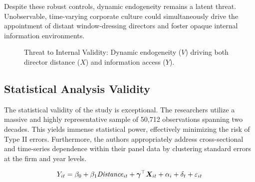 \documentclass[11pt, a4paper]{article}
\begin{document}
Despite these robust controls, dynamic endogeneity remains a latent threat. Unobservable, time-varying corporate culture could simultaneously drive the appointment of distant window-dressing directors and foster opaque internal information environments.

\begin{figure}[H]
	\centering
	\caption{Threat to Internal Validity: Dynamic endogeneity ($V$) driving both director distance ($X$) and information access ($Y$).}
\end{figure}

\subsection*{Statistical Analysis Validity}
The statistical validity of the study is exceptional. The researchers utilize a massive and highly representative sample of 50,712 observations spanning two decades. This yields immense statistical power, effectively minimizing the risk of Type II errors. Furthermore, the authors appropriately address cross-sectional and time-series dependence within their panel data by clustering standard errors at the firm and year levels.

\begin{equation}
	Y_{it} = \beta_0 + \beta_1 \mathit{Distance}_{it} + \bm{\gamma}^{\top} \boldsymbol{X}_{it} + \alpha_i + \delta_t + \varepsilon_{it}
\end{equation}
\end{document}
